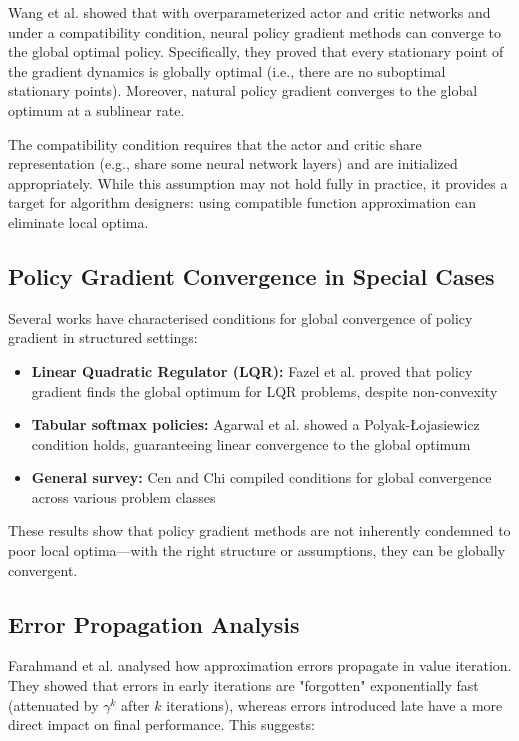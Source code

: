 \documentclass[12pt,a4paper]{report}
\begin{document}
Wang et al. \cite{wang2019neural} showed that with overparameterized actor and critic networks and under a compatibility condition, neural policy gradient methods can converge to the global optimal policy. Specifically, they proved that every stationary point of the gradient dynamics is globally optimal (i.e., there are no suboptimal stationary points). Moreover, natural policy gradient converges to the global optimum at a sublinear rate.

The compatibility condition requires that the actor and critic share representation (e.g., share some neural network layers) and are initialized appropriately. While this assumption may not hold fully in practice, it provides a target for algorithm designers: using compatible function approximation can eliminate local optima.

\subsection{Policy Gradient Convergence in Special Cases}

Several works have characterised conditions for global convergence of policy gradient in structured settings:

\begin{itemize}
    \item \textbf{Linear Quadratic Regulator (LQR):} Fazel et al. \cite{fazel2019global} proved that policy gradient finds the global optimum for LQR problems, despite non-convexity
    \item \textbf{Tabular softmax policies:} Agarwal et al. \cite{agarwal2020theory} showed a Polyak-Łojasiewicz condition holds, guaranteeing linear convergence to the global optimum
    \item \textbf{General survey:} Cen and Chi \cite{cen2023global} compiled conditions for global convergence across various problem classes
\end{itemize}

These results show that policy gradient methods are not inherently condemned to poor local optima—with the right structure or assumptions, they can be globally convergent.

\subsection{Error Propagation Analysis}

Farahmand et al. \cite{farahmand2010error} analysed how approximation errors propagate in value iteration. They showed that errors in early iterations are "forgotten" exponentially fast (attenuated by $\gamma^k$ after $k$ iterations), whereas errors introduced late have a more direct impact on final performance. This suggests:
\end{document}
